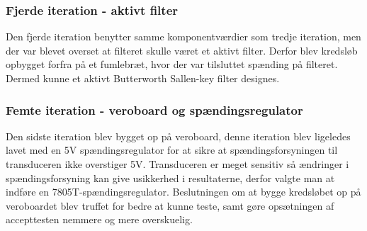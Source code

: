 \subsubsection{Fjerde iteration - aktivt filter}
Den fjerde iteration benytter samme komponentværdier som tredje iteration, men der var blevet overset at filteret skulle været et aktivt filter. Derfor blev kredsløb opbygget forfra på et fumlebræt, hvor der var tilsluttet spænding på filteret. Dermed kunne et aktivt Butterworth Sallen-key filter designes.
\subsubsection{Femte iteration - veroboard og spændingsregulator}
Den sidste iteration blev bygget op på veroboard, denne iteration blev ligeledes lavet med en 5V spændingsregulator for at sikre at spændingsforsyningen til transduceren ikke overstiger 5V. Transduceren er meget sensitiv så ændringer i spændingsforsyning kan give usikkerhed i resultaterne, derfor valgte man at indføre en 7805T-spændingsregulator. Beslutningen om at bygge kredsløbet op på veroboardet blev truffet for bedre at kunne teste, samt gøre opsætningen af accepttesten nemmere og mere overskuelig.
